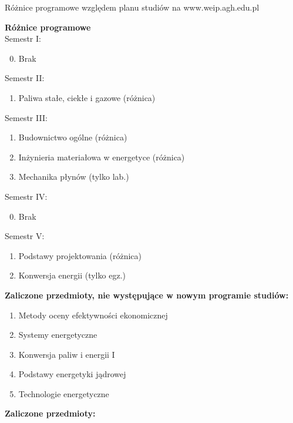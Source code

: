 \documentclass[a4paper,12pt]{article}
\begin{document}
\begin{center}
\Large{Różnice programowe względem planu studiów na www.weip.agh.edu.pl}
\end{center}
\vspace{20pt}
\textbf{Różnice programowe}\\
Semestr I:
\begin{enumerate}
\setcounter{enumi}{-1}
\item Brak
\end{enumerate}
Semestr II:
\begin{enumerate}
\item Paliwa stałe, ciekłe i gazowe (różnica)
\end{enumerate}
Semestr III:
\begin{enumerate}
\item Budownictwo ogólne (różnica)
\item Inżynieria materiałowa w energetyce (różnica)
\item Mechanika płynów (tylko lab.)
\end{enumerate}
Semestr IV:
\begin{enumerate}
\setcounter{enumi}{-1}
\item Brak
\end{enumerate}
Semestr V:
\begin{enumerate}
\item Podstawy projektowania (różnica)
\item Konwersja energii (tylko egz.)
\end{enumerate}
\vspace{20pt}
\textbf{Zaliczone przedmioty, nie występujące w nowym programie studiów:}
\begin{enumerate}
\item Metody oceny efektywności ekonomicznej
\item Systemy energetyczne
\item Konwersja paliw i energii I
\item Podstawy energetyki jądrowej
\item Technologie energetyczne
\end{enumerate}
\newpage
\textbf{Zaliczone przedmioty:}
\end{document}

